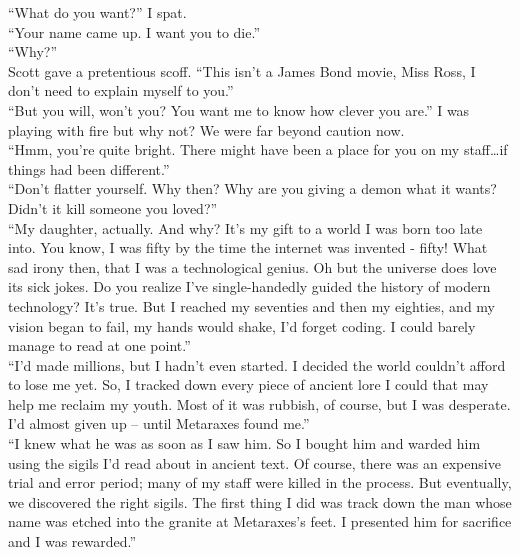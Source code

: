 \documentclass[a5paper]{scrartcl}
\begin{document}
\enquote{What do you want?} I spat.\\


\enquote{Your name came up. I want you to die.}\\


\enquote{Why?}\\


Scott gave a pretentious scoff. \enquote{This isn't a James Bond movie, Miss Ross, I don't need to explain myself to you.}\\


\enquote{But you will, won't you? You want me to know how clever you are.} I was playing with fire but why not? We were far beyond caution now. \\


\enquote{Hmm, you're quite bright. There might have been a place for you on my staff\dots if things had been different.}\\


\enquote{Don't flatter yourself. Why then? Why are you giving a demon what it wants? Didn't it kill someone you loved?}\\


\enquote{My daughter, actually. And why? It's my gift to a world I was born too late into. You know, I was fifty by the time the internet was invented - fifty! What sad irony then, that I was a technological genius. Oh but the universe does love its sick jokes. Do you realize I've single-handedly guided the history of modern technology? It's true. But I reached my seventies and then my eighties, and my vision began to fail, my hands would shake, I'd forget coding. I could barely manage to read at one point.}\\


\enquote{I'd made millions, but I hadn't even started. I decided the world couldn't afford to lose me yet. So, I tracked down every piece of ancient lore I could that may help me reclaim my youth. Most of it was rubbish, of course, but I was desperate. I'd almost given up -- until Metaraxes found me.}\\


\enquote{I knew what he was as soon as I saw him. So I bought him and warded him using the sigils I'd read about in ancient text.  Of course, there was an expensive trial and error period; many of my staff were killed in the process. But eventually, we discovered the right sigils. The first thing I did was track down the man whose name was etched into the granite at Metaraxes's feet. I presented him for sacrifice and I was rewarded.}\\
\end{document}
